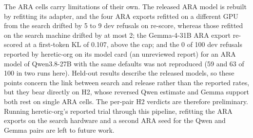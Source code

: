 The ARA cells carry limitations of their own. The released ARA model is
rebuilt by refitting its adapter, and the four ARA exports refitted on a
different GPU from the search drifted by 5 to 9 dev refusals on re-score,
whereas those refitted on the search machine drifted by at most 2; the
Gemma-4-31B ARA export re-scored at a first-token KL of 0.107, above the cap;
and the 0 of 100 dev refusals reported by heretic-org on its model card (an
unreviewed report) for an ARA model of
Qwen3.8-27B with the same defaults was not reproduced (59 and 63 of 100 in two
runs here). Held-out results describe the released models, so these points
concern the link between search and release rather than the reported rates,
but they bear directly on H2, whose reversed Qwen estimate and Gemma support both rest
on single ARA cells. The per-pair H2 verdicts are therefore preliminary.
Running heretic-org's reported trial through this pipeline, refitting the ARA
exports on the search hardware and a second ARA seed for the Qwen and Gemma
pairs are left to future work.

